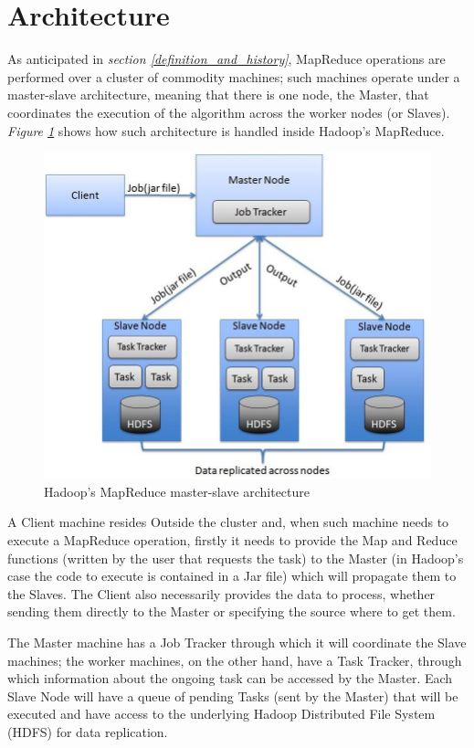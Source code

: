 \section{Architecture}
As anticipated in \textit{section \ref{definition_and_history}}, MapReduce operations are performed over a cluster of commodity machines; such machines operate under a master-slave architecture, meaning that there is one node, the Master, that coordinates the execution of the algorithm across the worker nodes (or Slaves). \textit{Figure \ref{fig:hadoop_master_slave_architecture}} shows how such architecture is handled inside Hadoop's MapReduce.

\begin{figure}[H]
    \centering
    \includegraphics[scale=0.45]{document/chapters/chapter_4/images/hadoop_master_slave_architecture.png}
    \caption{Hadoop's MapReduce master-slave architecture\cite{hadoop_map_reduce}}
    \label{fig:hadoop_master_slave_architecture}
\end{figure}

A Client machine resides Outside the cluster and, when such machine needs to execute a MapReduce operation, firstly it needs to provide the Map and Reduce functions (written by the user that requests the task) to the Master (in Hadoop's case the code to execute is contained in a Jar file) which will propagate them to the Slaves. The Client also necessarily provides the data to process, whether sending them directly to the Master or specifying the source where to get them.

The Master machine has a Job Tracker through which it will coordinate the Slave machines; the worker machines, on the other hand, have a Task Tracker, through which information about the ongoing task can be accessed by the Master. Each Slave Node will have a queue of pending Tasks (sent by the Master) that will be executed and have access to the underlying Hadoop Distributed File System (HDFS) for data replication.